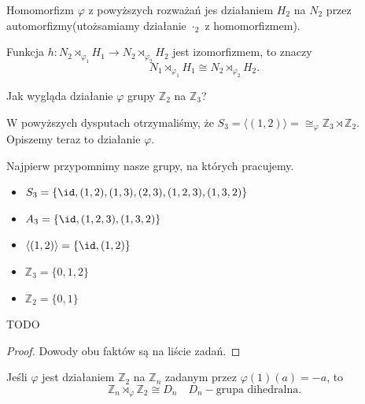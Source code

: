 \begin{fact}
	
		 Homomorfizm $\varphi$ z powyższych rozważań jes działaniem $H_2$ na $N_2$ przez 
			automorfizmy(utożsamiamy działanie $\cdot _{2}$ z homomorfizmem).
\end{fact}
\begin{fact}
		 Funkcja $h: N_2\rtimes_{\varphi_1}H_1 \rightarrow N_2\rtimes_{\varphi_2}H_2$ jest izomorfizmem, to znaczy \[
		 N_1\rtimes_{\varphi_1}H_1 \cong N_2\rtimes_{\varphi_2}H_2
		.\] 
\end{fact}
\begin{question}

	Jak wygląda działanie $\varphi$ grupy $\mathbb{Z}_2$ na $\mathbb{Z}_3$?
\end{question}
W powyższych dysputach otrzymaliśmy, że $S_{3} = \langle \left( 1,2 \right)\rangle = \cong_{\varphi} \mathbb{Z}_3 \rtimes \mathbb{Z}_2$. Opiszemy teraz to działanie $\varphi$.

Najpierw przypomnimy nasze grupy, na których pracujemy.
\begin{itemize}
	\item $S_{3} = \{\id, (1,2), (1,3), (2,3), (1,2,3), (1,3,2)\} $ 
	\item $A_3 = \{\id, (1,2,3), (1,3,2)\} $
	\item $\langle (1,2) \rangle = \{\id, (1,2)\} $
	\item $\mathbb{Z}_3 = \{0,1,2\} $ 
	\item $\mathbb{Z}_2 = \{0,1\} $
\end{itemize}
TODO
\begin{proof}

	Dowody obu faktów są na liście zadań.
\end{proof}
\begin{theorem}

	Jeśli $\varphi$ jest działaniem $\mathbb{Z}_2$ na $\mathbb{Z}_{n}$ zadanym przez $\varphi\left( 1 \right) \left( a \right) = -a$, to \[
	\mathbb{Z}_{n}\rtimes_{\varphi} \mathbb{Z}_2 \cong D_{n} \quad D_{n}-\text{grupa dihedralna}
	.\] 	
\end{theorem}

